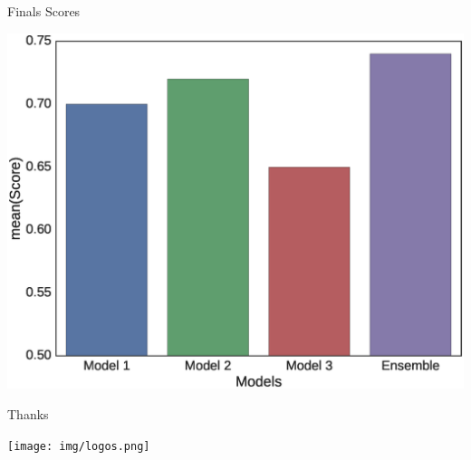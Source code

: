 \documentclass{beamer}
\begin{document}
\begin{frame}{Finals Scores}
  \begin{center}
  \includegraphics[scale=0.36]{img/final_scores.eps}
  \end{center}

\end{frame}


\begin{frame}{Thanks}
 
  \begin{center}
  \texttt{[image: img/logos.png]}
  \end{center}

\end{frame}




\end{document}
